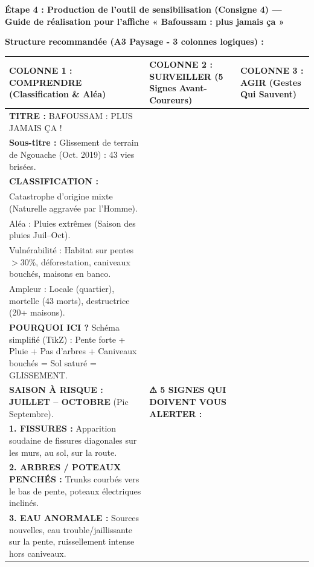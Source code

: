\documentclass[11pt]{article}
\newcommand{\cle}[1]{{\popxbold\color{popdark}#1}}
\begin{document}
\begin{exoresolu}
\textbf{Étape 4 : Production de l'outil de sensibilisation (Consigne 4) — Guide de réalisation pour l'affiche « Bafoussam : plus jamais ça »}

\textbf{Structure recommandée (A3 Paysage - 3 colonnes logiques) :}

\begin{center}
\begin{tabularx}{\linewidth}{|X|X|X|}\hline
\rowcolor{popblueL}
\textbf{COLONNE 1 : COMPRENDRE (Classification \& Aléa)} & \textbf{COLONNE 2 : SURVEILLER (5 Signes Avant-Coureurs)} & \textbf{COLONNE 3 : AGIR (Gestes Qui Sauvent)} \\ \hline
\vspace{0.2cm}
\textbf{TITRE :} BAFOUSSAM : PLUS JAMAIS ÇA ! \\
\vspace{0.2cm}
\textbf{Sous-titre :} Glissement de terrain de Ngouache (Oct. 2019) : 43 vies brisées. \\
\vspace{0.3cm}
\textbf{CLASSIFICATION :} \\
\cle{Catastrophe d'origine mixte} (Naturelle aggravée par l'Homme). \\
\cle{Aléa :} Pluies extrêmes (Saison des pluies Juil--Oct). \\
\cle{Vulnérabilité :} Habitat sur pentes $>30\%$, déforestation, caniveaux bouchés, maisons en banco. \\
\cle{Ampleur :} Locale (quartier), mortelle (43 morts), destructrice (20+ maisons). \\
\vspace{0.3cm}
\textbf{POURQUOI ICI ?} Schéma simplifié (TikZ) : Pente forte + Pluie + Pas d'arbres + Caniveaux bouchés = Sol saturé = GLISSEMENT. \\
\vspace{0.2cm}
\textbf{SAISON À RISQUE :} \textbf{JUILLET -- OCTOBRE} (Pic Septembre). &
\vspace{0.2cm}
\textbf{⚠ 5 SIGNES QUI DOIVENT VOUS ALERTER :} \\
\vspace{0.1cm}
\textbf{1. FISSURES :} Apparition soudaine de fissures diagonales sur les murs, au sol, sur la route. \\
\textbf{2. ARBRES / POTEAUX PENCHÉS :} Trunks courbés vers le bas de pente, poteaux électriques inclinés. \\
\textbf{3. EAU ANORMALE :} Sources nouvelles, eau trouble/jaillissante sur la pente, ruissellement intense hors caniveaux. \\

\end{tabularx}
\end{center}
\end{exoresolu}
\end{document}
